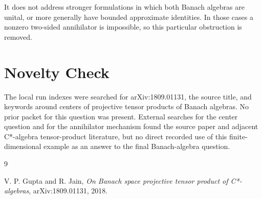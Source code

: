 \documentclass[11pt]{article}
\begin{document}
It does not address stronger formulations in which both Banach algebras are
unital, or more generally have bounded approximate identities. In those cases a
nonzero two-sided annihilator is impossible, so this particular obstruction is
removed.

\section*{Novelty Check}

The local run indexes were searched for arXiv:1809.01131, the source title, and
keywords around centers of projective tensor products of Banach algebras. No
prior packet for this question was present. External searches for the center
question and for the annihilator mechanism found the source paper and adjacent
C*-algebra tensor-product literature, but no direct recorded use of this
finite-dimensional example as an answer to the final Banach-algebra question.

\begin{thebibliography}{9}

V. P. Gupta and R. Jain,
\emph{On Banach space projective tensor product of C*-algebras},
arXiv:1809.01131, 2018.

\end{thebibliography}
\end{document}

